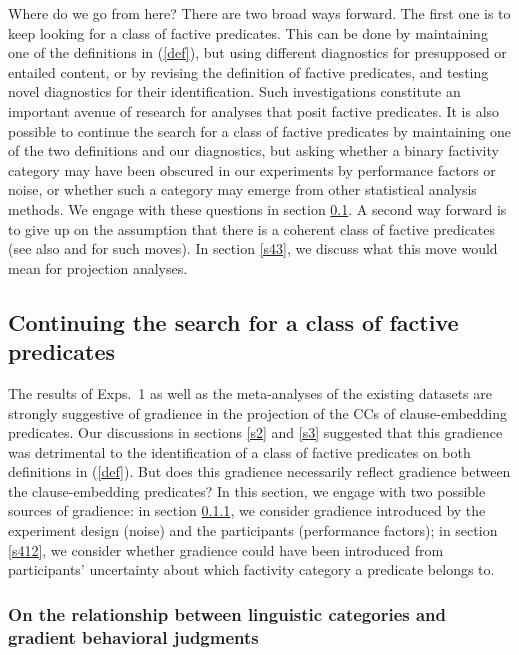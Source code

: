\documentclass[11pt,fleqn]{article}
\newcommand{\6}{\mbox{$[\hspace*{-.6mm}[$}}
\newcommand{\9}{\mbox{$]\hspace*{-.6mm}]$}}
\begin{document}
Where do we go from here? There are two broad ways forward. The first one is to keep looking for a class of factive predicates. This can be done by maintaining one of the definitions in (\ref{def}), but using different diagnostics for presupposed or entailed content, or by revising the definition of factive predicates, and testing novel diagnostics for their identification. Such investigations constitute an important avenue of research for analyses that posit factive predicates. It is also possible to continue the search for a class of factive predicates by maintaining one of the two definitions and our diagnostics, but asking whether a binary factivity category may have been obscured in our experiments by performance factors or noise, or whether such a category may emerge from other statistical analysis methods. We engage with these questions in section \ref{s41}. A second way forward is to give up on the assumption that there is a coherent class of factive predicates (see also \citealt{karttunen2016} and \citealt{djaerv-thesis} for such moves). In section \ref{s43}, we discuss what this move would mean for projection analyses.

\subsection{Continuing the search for a class of factive predicates}\label{s41}

The results of Exps.~1 as well as the meta-analyses of the existing datasets are strongly suggestive of gradience in the projection of the CCs of clause-embedding predicates. Our discussions in sections \ref{s2} and \ref{s3} suggested that this gradience was detrimental to the identification of a class of factive predicates on both definitions in (\ref{def}). But does this gradience necessarily reflect gradience between the clause-embedding predicates? In this section, we engage with two possible sources of gradience: in section \ref{s411}, we consider gradience introduced by the experiment design (noise) and the participants (performance factors); in section \ref{s412}, we consider whether gradience could have been introduced from participants' uncertainty about which factivity category a predicate belongs to.

\subsubsection{On the relationship between linguistic categories and gradient behavioral judgments}\label{s411}
\end{document}
